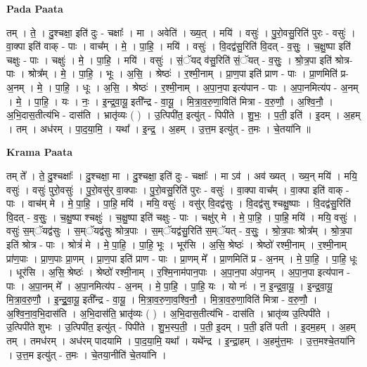 \documentclass[17pt]{extarticle}
\begin{document}
\textbf{Pada Paata} \newline

तम् । ते॒ । दु॒श्चक्षा॒ इति॑ दुः - चक्षाः᳚ । मा । अवेति॑ । ख्य॒त् । मयि॑ । वसुः॑ । पु॒रो॒वसु॒रिति॑ पुरः - वसुः॑ । वा॒क्पा इति॑ वाक् - पाः । वाच᳚म् । मे॒ । पा॒हि॒ । मयि॑ । वसुः॑ । वि॒दद्व॑सु॒रिति॑ वि॒दत् - व॒सुः॒ । च॒क्षु॒ष्पा इति॑ चक्षुः - पाः । चक्षुः॑ । मे॒ । पा॒हि॒ । मयि॑ । वसुः॑ । सं॒ॅयद् व॑सु॒रिति॑ सं॒ॅयत् - व॒सुः॒ । श्रो॒त्र॒पा इति॑ श्रोत्र-पाः । श्रोत्र᳚म् । मे॒ । पा॒हि॒ । भूः । अ॒सि॒ । श्रेष्ठः॑ । र॒श्मी॒नाम् । प्रा॒ण॒पा इति॑ प्राण - पाः । प्रा॒णमिति॑ प्र- अ॒नम् । मे॒ । पा॒हि॒ । धूः । अ॒सि॒ । श्रेष्ठः॑ । र॒श्मी॒नाम् । अ॒पा॒न॒पा इत्य॑पान - पाः । अ॒पा॒नमित्य॑प - अ॒नम् । मे॒ । पा॒हि॒ । यः । नः॒ । इ॒न्द्र॒वा॒यू॒ इती᳚न्द्र - वा॒यू॒ । मि॒त्रा॒व॒रु॒णा॒विति॑ मित्रा - व॒रु॒णौ॒ । अ॒श्वि॒नौ॒ । अ॒भि॒दास॒तीत्य॑भि - दास॑ति । भ्रातृ॑व्यः ( ) । उ॒त्पिपी॑त॒ इत्यु॑त् - पिपी॑ते । शु॒भः॒ । प॒ती॒ इति॑ । इ॒दम् । अ॒हम् । तम् । अध॑रम् । पा॒द॒या॒मि॒ । यथा᳚ । इ॒न्द्र॒ । अ॒हम् । उ॒त्त॒म इत्यु॑त् - त॒मः । चे॒तया॑नि ॥  \newline


\textbf{Krama Paata} \newline

तम् ते᳚ । ते॒ दु॒श्चक्षाः᳚ । दु॒श्चक्षा॒ मा । दु॒श्चक्षा॒ इति॑ दुः - चक्षाः᳚ । मा ऽव॑ । अव॑ ख्यत् । ख्य॒न् मयि॑ । मयि॒ वसुः॑ । वसुः॑ पुरो॒वसुः॑ । पु॒रो॒वसु॑र् वा॒क्पाः । पु॒रो॒वसु॒रिति॑ पुरः - वसुः॑ । वा॒क्पा वाच᳚म् । वा॒क्पा इति॑ वाक् - पाः । वाच॑म् मे । मे॒ पा॒हि॒ । पा॒हि॒ मयि॑ । मयि॒ वसुः॑ । वसु॑र् वि॒दद्व॑सुः । वि॒दद्व॑सु श्चक्षु॒ष्पाः । वि॒दद्व॑सु॒रिति॑ वि॒दत् - व॒सुः॒ । च॒क्षु॒ष्पा श्चक्षुः॑ । च॒क्षु॒ष्पा इति॑ चक्षुः - पाः । चक्षु॑र् मे । मे॒ पा॒हि॒ । पा॒हि॒ मयि॑ । मयि॒ वसुः॑ । वसुः॑ स॒म्ॅयद्व॑सुः । स॒म्ॅयद्व॑सुः श्रोत्र॒पाः । स॒म्ॅयद्व॑सु॒रिति॑ स॒म्ॅयत् - व॒सुः॒ । श्रो॒त्र॒पाः श्रोत्र᳚म् । श्रो॒त्र॒पा इति॑ श्रोत्र - पाः । श्रोत्रं॑ मे । मे॒ पा॒हि॒ । पा॒हि॒ भूः । भूर॑सि । अ॒सि॒ श्रेष्ठः॑ । श्रेष्ठो॑ रश्मी॒नाम् । र॒श्मी॒नाम् प्रा॑ण॒पाः । प्रा॒ण॒पाः प्रा॒णम् । प्रा॒ण॒पा इति॑ प्राण - पाः । प्रा॒णम् मे᳚ । प्रा॒णमिति॑ प्र - अ॒नम् । मे॒ पा॒हि॒ । पा॒हि॒ धूः । धूर॑सि । अ॒सि॒ श्रेष्ठः॑ । श्रेष्ठो॑ रश्मी॒नाम् । र॒श्मि॒नाम॑पान॒पाः । अ॒पा॒न॒पा अ॑पा॒नम् । अ॒पा॒न॒पा इत्य॑पान - पाः । अ॒पा॒नम् मे᳚ । अ॒पा॒नमित्य॑प - अ॒नम् । मे॒ पा॒हि॒ । पा॒हि॒ यः । यो नः॑ । न॒ इ॒न्द्र॒वा॒यू॒ । इ॒न्द्र॒वा॒यू॒ मि॒त्रा॒व॒रु॒णौ॒ । इ॒न्द्र॒॒वा॒यू॒ इती᳚न्द्र - वा॒यू॒ । मि॒त्रा॒व॒रु॒णा॒व॒श्वि॒नौ॒ । मि॒त्रा॒व॒रु॒णा॒विति॑ मित्रा - व॒रु॒णौ॒ । अ॒श्वि॒ना॒व॒भि॒दास॑ति । अ॒भि॒दास॑ति॒ भ्रातृ॑व्यः ( ) । अ॒भि॒दास॒तीत्य॑भि - दास॑ति । भ्रातृ॑व्य उ॒त्पिपी॑ते । उ॒त्पिपी॑ते शुभः । उ॒त्पिपी॑त॒ इत्यु॑त् - पिपी॑ते । शु॒भ॒स्प॒ती॒ । प॒ती॒ इ॒दम् । प॒ती॒ इति॑ पती । इ॒दम॒हम् । अ॒हम् तम् । तमध॑रम् । अध॑रम् पादयामि । पा॒द॒या॒मि॒ यथा᳚ । यथे᳚न्द्र । इ॒न्द्रा॒हम् । अ॒हमु॑त्त॒मः । उ॒त्त॒मश्चे॒तया॑नि । उ॒त्त॒म इत्यु॑त् - त॒मः । चे॒तया॒नीति॑ चे॒तया॑नि । \newline
\end{document}
